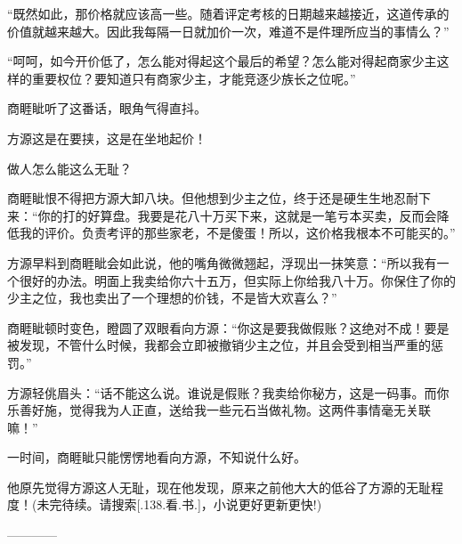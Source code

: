 \begin{this_body}
“既然如此，那价格就应该高一些。随着评定考核的日期越来越接近，这道传承的价值就越来越大。因此我每隔一日就加价一次，难道不是件理所应当的事情么？”

“呵呵，如今开价低了，怎么能对得起这个最后的希望？怎么能对得起商家少主这样的重要权位？要知道只有商家少主，才能竞逐少族长之位呢。”

商睚眦听了这番话，眼角气得直抖。

方源这是在要挟，这是在坐地起价！

做人怎么能这么无耻？

商睚眦恨不得把方源大卸八块。但他想到少主之位，终于还是硬生生地忍耐下来：“你的打的好算盘。我要是花八十万买下来，这就是一笔亏本买卖，反而会降低我的评价。负责考评的那些家老，不是傻蛋！所以，这价格我根本不可能买的。”

方源早料到商睚眦会如此说，他的嘴角微微翘起，浮现出一抹笑意：“所以我有一个很好的办法。明面上我卖给你六十五万，但实际上你给我八十万。你保住了你的少主之位，我也卖出了一个理想的价钱，不是皆大欢喜么？”

商睚眦顿时变色，瞪圆了双眼看向方源：“你这是要我做假账？这绝对不成！要是被发现，不管什么时候，我都会立即被撤销少主之位，并且会受到相当严重的惩罚。”

方源轻佻眉头：“话不能这么说。谁说是假账？我卖给你秘方，这是一码事。而你乐善好施，觉得我为人正直，送给我一些元石当做礼物。这两件事情毫无关联嘛！”

一时间，商睚眦只能愣愣地看向方源，不知说什么好。

他原先觉得方源这人无耻，现在他发现，原来之前他大大的低谷了方源的无耻程度！(未完待续。请搜索[.138.看.书.]，小说更好更新更快!)

------------

\end{this_body}

